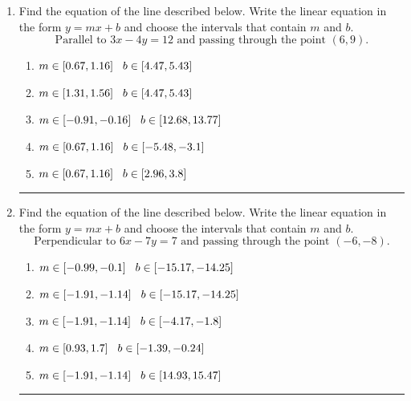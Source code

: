 \documentclass[14pt]{extbook}
\newcommand{\litem}[1]{\item#1\hspace*{-1cm}\rule{\textwidth}{0.4pt}}
\begin{document}
\begin{enumerate}
{\begin{enumerate}[label=\Alph*.]
\end{enumerate} }
\litem{
Find the equation of the line described below. Write the linear equation in the form $ y=mx+b $ and choose the intervals that contain $m$ and $b$.\[ \text{Parallel to } 3 x - 4 y = 12 \text{ and passing through the point } (6, 9). \]\begin{enumerate}[label=\Alph*.]
\item \( m \in [0.67, 1.16] \hspace*{3mm} b \in [4.47, 5.43] \)
\item \( m \in [1.31, 1.56] \hspace*{3mm} b \in [4.47, 5.43] \)
\item \( m \in [-0.91, -0.16] \hspace*{3mm} b \in [12.68, 13.77] \)
\item \( m \in [0.67, 1.16] \hspace*{3mm} b \in [-5.48, -3.1] \)
\item \( m \in [0.67, 1.16] \hspace*{3mm} b \in [2.96, 3.8] \)

\end{enumerate} }
\litem{
Find the equation of the line described below. Write the linear equation in the form $ y=mx+b $ and choose the intervals that contain $m$ and $b$.\[ \text{Perpendicular to } 6 x - 7 y = 7 \text{ and passing through the point } (-6, -8). \]\begin{enumerate}[label=\Alph*.]
\item \( m \in [-0.99, -0.1] \hspace*{3mm} b \in [-15.17, -14.25] \)
\item \( m \in [-1.91, -1.14] \hspace*{3mm} b \in [-15.17, -14.25] \)
\item \( m \in [-1.91, -1.14] \hspace*{3mm} b \in [-4.17, -1.8] \)
\item \( m \in [0.93, 1.7] \hspace*{3mm} b \in [-1.39, -0.24] \)
\item \( m \in [-1.91, -1.14] \hspace*{3mm} b \in [14.93, 15.47] \)


\end{enumerate}}
\end{enumerate}
\end{document}
